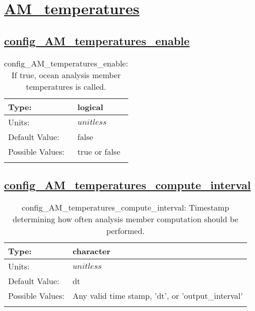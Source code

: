 \section[AM\_temperatures]{\hyperref[sec:nm_tab_AM_temperatures]{AM\_temperatures}}
\label{sec:nm_sec_AM_temperatures}
\subsection[config\_AM\_temperatures\_enable]{\hyperref[sec:nm_tab_AM_temperatures]{config\_AM\_temperatures\_enable}}
\label{subsec:nm_sec_config_AM_temperatures_enable}
\begin{center}
\begin{longtable}{| p{2.0in} || p{4.0in} |}
    \hline
    Type: & logical \\
    \hline
    Units: & $unitless$ \\
    \hline
    Default Value: & false \\
    \hline
    Possible Values: & true or false \\
    \hline
    \caption{config\_AM\_temperatures\_enable: If true, ocean analysis member temperatures is called.}
\end{longtable}
\end{center}
\subsection[config\_AM\_temperatures\_compute\_interval]{\hyperref[sec:nm_tab_AM_temperatures]{config\_AM\_temperatures\_compute\_interval}}
\label{subsec:nm_sec_config_AM_temperatures_compute_interval}
\begin{center}
\begin{longtable}{| p{2.0in} || p{4.0in} |}
    \hline
    Type: & character \\
    \hline
    Units: & $unitless$ \\
    \hline
    Default Value: & dt \\
    \hline
    Possible Values: & Any valid time stamp, 'dt', or 'output\_interval' \\
    \hline
    \caption{config\_AM\_temperatures\_compute\_interval: Timestamp determining how often analysis member computation should be performed.}
\end{longtable}
\end{center}
